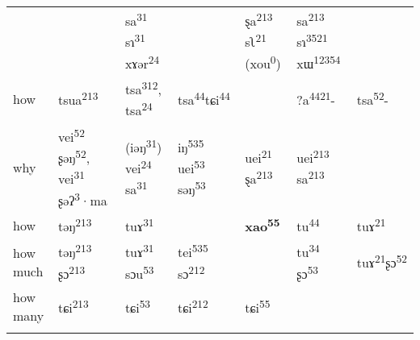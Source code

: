\begin{table}[p]
\begin{tabularx}{\textwidth}{XXXX XXX}
&  & sa\textsuperscript{31} sɿ\textsuperscript{31} xɤər\textsuperscript{24} &  & ȿa\textsuperscript{213} sʅ\textsuperscript{21} (xou\textsuperscript{0}) & sa\textsuperscript{213} sɿ\textsuperscript{3521} xɯ\textsuperscript{12354} & \\
how & tsua\textsuperscript{213} & tsa\textsuperscript{312}, tsa\textsuperscript{24} & tsa\textsuperscript{44}tɕi\textsuperscript{44} &  & ?a\textsuperscript{4421}- & tsa\textsuperscript{52}-\\
why & vei\textsuperscript{52} ʂəŋ\textsuperscript{52}, vei\textsuperscript{31} ʂəʔ\textsuperscript{3}·ma & (iəŋ\textsuperscript{31}) vei\textsuperscript{24} sa\textsuperscript{31} & iŋ\textsuperscript{535} uei\textsuperscript{53} səŋ\textsuperscript{53} & uei\textsuperscript{21} ȿa\textsuperscript{213} & uei\textsuperscript{213} sa\textsuperscript{213} & \\
how & təŋ\textsuperscript{213} & tuɤ\textsuperscript{31} &  & \textbf{xao\textsuperscript{55}} & tu\textsuperscript{44} & tuɤ\textsuperscript{21}\\
how much & təŋ\textsuperscript{213} ʂɔ\textsuperscript{213} & tuɤ\textsuperscript{31} sɔu\textsuperscript{53} & tei\textsuperscript{535} sɔ\textsuperscript{212} &  & tu\textsuperscript{34} ʂɔ\textsuperscript{53} & tuɤ\textsuperscript{21}ʂɔ\textsuperscript{52}\\
how many & tɕi\textsuperscript{213} & tɕi\textsuperscript{53} & tɕi\textsuperscript{212} & tɕi\textsuperscript{55} &  & \\
\lspbottomrule
\end{tabularx}
\end{table}

